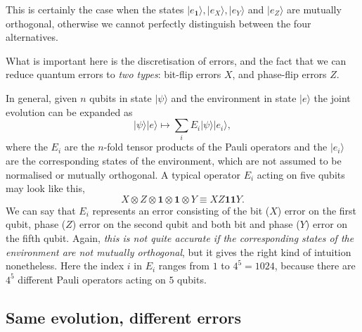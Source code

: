 \documentclass[fleqn]{article}
\newenvironment{idea}{\noindent}{\medskip}
\begin{document}
This is certainly the case when the states \(|e_{\mathbf{1}}\rangle, |e_X\rangle, |e_Y\rangle\) and \(|e_Z\rangle\) are mutually orthogonal, otherwise we cannot perfectly distinguish between the four alternatives.

\begin{idea}

What is important here is the discretisation of errors, and the fact that we can reduce quantum errors to \emph{two types}: bit-flip errors \(X\), and phase-flip errors \(Z\).

\end{idea}

In general, given \(n\) qubits in state \(|\psi\rangle\) and the environment in state \(|e\rangle\) the joint evolution can be expanded as
\[
|\psi\rangle|e\rangle \longmapsto \sum_i E_i|\psi\rangle|e_i\rangle,
\]
where the \(E_i\) are the \(n\)-fold tensor products of the Pauli operators and the \(|e_i\rangle\) are the corresponding states of the environment, which are not assumed to be normalised or mutually orthogonal.
A typical operator \(E_i\) acting on five qubits may look like this,
\[
  X\otimes Z \otimes \mathbf{1}\otimes \mathbf{1}\otimes Y
  \equiv XZ\mathbf{1}\mathbf{1}Y.
\]
We can say that \(E_i\) represents an error consisting of the bit (\(X\)) error on the first qubit, phase (\(Z\)) error on the second qubit and both bit and phase (\(Y\)) error on the fifth qubit.
Again, \emph{this is not quite accurate if the corresponding states of the environment are not mutually orthogonal}, but it gives the right kind of intuition nonetheless.
Here the index \(i\) in \(E_i\) ranges from \(1\) to \(4^5=1024\), because there are \(4^5\) different Pauli operators acting on \(5\) qubits.

\hypertarget{same-evolution-different-errors}{%
\subsection{Same evolution, different errors}\label{same-evolution-different-errors}}
\end{document}
